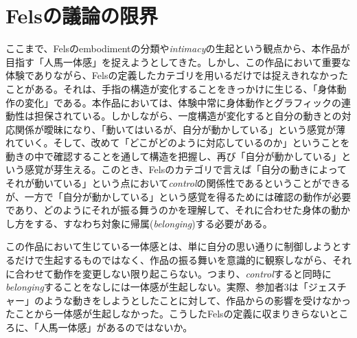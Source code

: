 \section{Felsの議論の限界}
ここまで、Felsのembodimentの分類や\textit{intimacy}の生起という観点から、本作品が目指す「人馬一体感」を捉えようとしてきた。しかし、この作品において重要な体験でありながら、Felsの定義したカテゴリを用いるだけでは捉えきれなかったことがある。それは、手指の構造が変化することをきっかけに生じる、「身体動作の変化」である。本作品においては、体験中常に身体動作とグラフィックの連動性は担保されている。しかしながら、一度構造が変化すると自分の動きとの対応関係が曖昧になり、「動いてはいるが、自分が動かしている」という感覚が薄れていく。そして、改めて「どこがどのように対応しているのか」ということを動きの中で確認することを通して構造を把握し、再び「自分が動かしている」という感覚が芽生える。このとき、Felsのカテゴリで言えば「自分の動きによってそれが動いている」という点において\textit{control}の関係性であるということができるが、一方で「自分が動かしている」という感覚を得るためには確認の動作が必要であり、どのようにそれが振る舞うのかを理解して、それに合わせた身体の動かし方をする、すなわち対象に帰属(\textit{belonging})する必要がある。

この作品において生じている一体感とは、単に自分の思い通りに制御しようとするだけで生起するものではなく、作品の振る舞いを意識的に観察しながら、それに合わせて動作を変更しない限り起こらない。つまり、\textit{control}すると同時に\textit{belonging}することをなしには一体感が生起しない。実際、参加者3は「ジェスチャー」のような動きをしようとしたことに対して、作品からの影響を受けなかったことから一体感が生起しなかった。こうしたFelsの定義に収まりきらないところに、「人馬一体感」があるのではないか。





